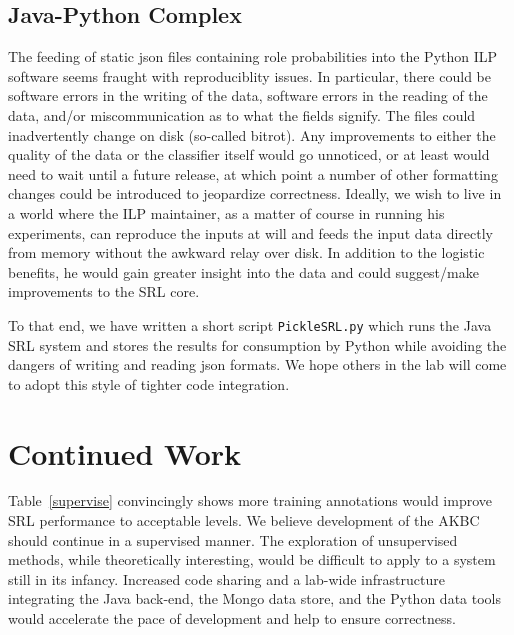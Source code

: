 \documentclass{article} %
\begin{document}
\subsection{Java-Python Complex}
The feeding of static json files containing role probabilities into the Python ILP software seems fraught with reproduciblity issues.  In particular, there could be software errors in the writing of the data, software errors in the reading of the data, and/or miscommunication as to what the fields signify.  The files could inadvertently change on disk (so-called bitrot).  Any improvements to either the quality of the data or the classifier itself would go unnoticed, or at least would need to wait until a future release, at which point a number of other formatting changes could be introduced to jeopardize correctness.  Ideally, we wish to live in a world where the ILP maintainer, as a matter of course in running his experiments, can reproduce the inputs at will and feeds the input data directly from memory without the awkward relay over disk.  In addition to the logistic benefits, he would gain greater insight into the data and could suggest/make improvements to the SRL core.

To that end, we have written a short script {\tt PickleSRL.py} which runs the Java SRL system and stores the results for consumption by Python while avoiding the dangers of writing and reading json formats.  We hope others in the lab will come to adopt this style of tighter code integration.

\section{Continued Work}
Table~\ref{supervise} convincingly shows more training annotations would improve SRL performance to acceptable levels.  We believe development of the AKBC should continue in a supervised manner.  The exploration of unsupervised methods, while theoretically interesting, would be difficult to apply to a system still in its infancy.  Increased code sharing and a lab-wide infrastructure integrating the Java back-end, the Mongo data store, and the Python data tools would accelerate the pace of development and help to ensure correctness.

\small{
\printbibliography
}
\end{document}
